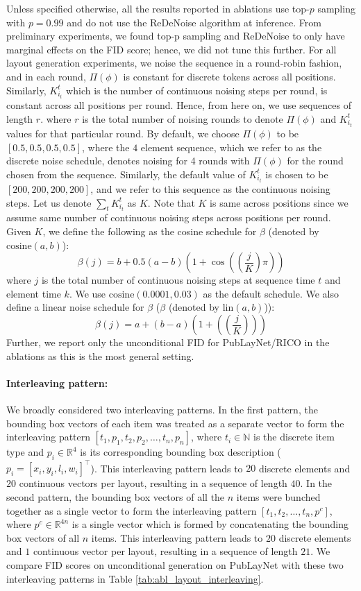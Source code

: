 Unless specified otherwise, all the results reported in ablations use top-$p$ sampling with $p = 0.99$ and do not use the ReDeNoise algorithm at inference. From preliminary experiments, we found top-p sampling and ReDeNoise to only have marginal effects on the FID score; hence, we did not tune this further. For all layout generation experiments, we noise the sequence in a round-robin fashion, and in each round, $\Pi(\phi)$ is constant for discrete tokens across all positions. Similarly, $K_{i_t}^{t}$ which is the number of continuous noising steps per round, is constant across all positions per round. Hence, from here on, we use sequences of length $r$. where $r$ is the total number of noising rounds to denote $\Pi(\phi)$ and $K_{i_t}^{t}$ values for that particular round. By default, we choose $\Pi(\phi)$ to be $[0.5, 0.5, 0.5, 0.5]$, where the $4$ element sequence, which we refer to as the discrete noise schedule, denotes noising for 4 rounds with $\Pi(\phi)$ for the round chosen from the sequence. Similarly, the default value of $K_{i_t}^{t}$ is chosen to be $[200, 200, 200, 200]$, and we refer to this sequence as the continuous noising steps. Let us denote $\sum_{t}K_{i_t}^{t} $ as $K$. Note that $K$ is same across positions since we assume same number of continuous noising steps across positions per round. Given $K$, we define the following as the cosine schedule for $\beta$ (denoted by $\text{cosine}(a, b)$):
$$ \beta(j) = b + 0.5(a - b)(1 + \cos(\left(\frac{j}{K} \right)\pi)) $$
where $j$ is the total number of continuous noising steps at sequence time $t$ and element time $k$. We use $\text{cosine}(0.0001, 0.03)$ as the default schedule. We also define a linear noise schedule for $\beta$ ($\beta$ (denoted by $\text{lin}(a, b)$)):
$$ \beta(j) = a + (b - a)(1 + (\left(\frac{j}{K} \right))) $$
Further, we report only the unconditional FID for PubLayNet/RICO in the ablations as this is the most general setting.
\paragraph{Interleaving pattern:}
We broadly considered two interleaving patterns. In the first pattern, the bounding box vectors of each item was treated as a separate vector to form the interleaving pattern $[t_1, p_1, t_2, p_2, \dots, t_n, p_n ]$, where $t_i \in \mathbb{N}$ is the discrete item type and $p_i \in \mathbb{R}^{4}$ is its corresponding bounding box description ($p_i = [x_i, y_i, l_i, w_i]^\top$).  This interleaving pattern leads to $20$ discrete elements and $20$ continuous vectors per layout, resulting in a sequence of length $40$. In the second pattern, the bounding box vectors of all the $n$ items were bunched together as a single vector to form the interleaving pattern $[t_1, t_2, \dots, t_n, p^c ]$, where $p^c \in \mathbb{R}^{4n}$ is a single vector which is formed by concatenating the bounding box vectors of all $n$ items. This interleaving pattern leads to $20$ discrete elements and $1$ continuous vector per layout, resulting in a sequence of length $21$. We compare FID scores on unconditional generation on PubLayNet with these two interleaving patterns in Table \ref{tab:abl_layout_interleaving}.

